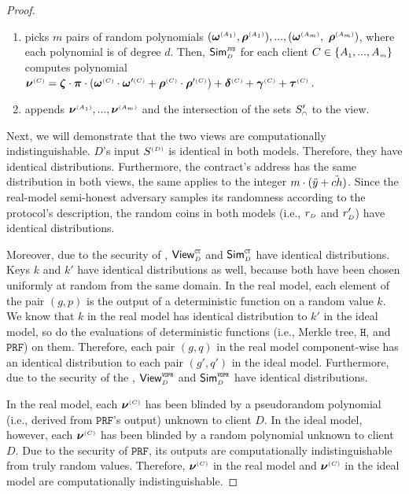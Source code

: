 \begin{proof}
\begin{enumerate}
\item picks $m$ pairs of random polynomials $( {\bm\omega}^{\scriptscriptstyle (A_1)},  {\bm\rho}^{\scriptscriptstyle (A_1)}),..., ( {\bm\omega}^{\scriptscriptstyle (A_m)},$ $  {\bm\rho}^{\scriptscriptstyle (A_m)})$, where each polynomial is of degree $d$. Then, $\mathsf{Sim}^{\scriptscriptstyle \mathtt{JUS}}_{\scriptscriptstyle D}$ for each client $C\in  \{  {  A}_{ \scriptscriptstyle {   1}}, ...,   {  A}_{ \scriptscriptstyle {   m}}\} $ computes polynomial $ {\bm\nu}^{\scriptscriptstyle (C)}= {\bm\zeta}\cdot {\bm\pi}\cdot(  {\bm\omega}^{\scriptscriptstyle (C)}\cdot  {\bm\omega}'^{\scriptscriptstyle (C)}+  {\bm\rho}^{\scriptscriptstyle (C)}\cdot  {\bm\rho}'^{\scriptscriptstyle (C)})+ {\bm\delta}^{\scriptscriptstyle (C)}+ {\bm\gamma}^{\scriptscriptstyle(C)}+  {\bm\tau}^{ \scriptscriptstyle {  {(C)}}}$. 
%
\item appends $ {\bm\nu}^{\scriptscriptstyle (A_1)},...,  {\bm\nu}^{\scriptscriptstyle (A_m)}$ and the intersection of the sets $S'_{\scriptscriptstyle \cap}$ to the view. 
%
\end{enumerate}



 Next, we will demonstrate that the two views are computationally indistinguishable. $D$'s input $S^{\scriptscriptstyle (D)}$ is
 identical in both models. Therefore, they have identical distributions. Furthermore, the contract's address has the same distribution in both views, the same applies to the integer $ m\cdot(\ddot{y}+\ddot{ch})$. Since the real-model semi-honest adversary samples its randomness according to the protocol’s description, the random coins in both models (i.e., $r_{\scriptscriptstyle D}$  and $r'_{\scriptscriptstyle D}$) have identical distributions. 
 
 Moreover, due to the security of  \ct, $\mathsf{View}^{\scriptscriptstyle \mathtt{CT}}_{\scriptscriptstyle D}$ and $\mathsf{Sim}^{\scriptscriptstyle \mathtt{CT}}_{\scriptscriptstyle D}$ have identical distributions. Keys $k$ and $  k'$ have identical distributions as well, because both have been chosen uniformly at random from the same domain.  In the real model, each element of the pair $(g, p)$ is the output of a deterministic function on a random value $k$. We know that $k$ in the real model has identical distribution to $  k'$ in the ideal model, so do the evaluations of deterministic functions (i.e., Merkle tree, $\mathtt{H}$, and $\mathtt {PRF}$) on them. Therefore, each pair $(g, q)$ in the real model component-wise has an identical distribution to each pair $(g', q')$ in the ideal model.  
 Furthermore, due to the security of the \vopr, $\mathsf{View}^{\scriptscriptstyle \mathtt{VOPR}}_{\scriptscriptstyle D}$ and $\mathsf{Sim}^{\scriptscriptstyle \mathtt{VOPR}}_{\scriptscriptstyle D}$ have identical distributions.
 
 
 In the real model, each $\bm\nu^{\scriptscriptstyle (C)}$ has been blinded by a pseudorandom polynomial (i.e., derived from $\mathtt{PRF}$'s output) unknown to client $D$. In the ideal model, however, each $ {\bm\nu}^{\scriptscriptstyle (C)}$ has been blinded by a random polynomial unknown to client $D$. Due to the security of $\mathtt{PRF}$,  its outputs are computationally indistinguishable from truly random values.  Therefore, ${\bm\nu}^{\scriptscriptstyle (C)}$ in the real model and $ {\bm\nu}^{\scriptscriptstyle (C)}$ in the ideal model are computationally indistinguishable. 
 

\end{proof}
